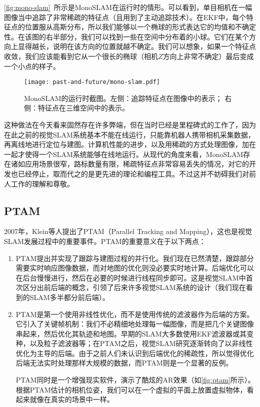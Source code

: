 \autoref{fig:mono-slam}~所示是MonoSLAM在运行时的情形。可以看到，单目相机在一幅图像当中追踪了非常稀疏的特征点（且用到了主动追踪技术）。在EKF中，每个特征点的位置服从高斯分布，所以我们能够以一个椭球的形式表达它的均值和不确定性。在该图的右半部分，我们可以找到一些在空间中分布着的小球。它们在某个方向上显得越长，说明在该方向的位置就越不确定。我们可以想象，如果一个特征点收敛，我们应该能看到它从一个很长的椭球（相机$Z$方向上非常不确定）最后变成一个小点的样子。

\begin{figure}[!htp]
	\centering
	\texttt{[image: past-and-future/mono-slam.pdf]}
	\caption{MonoSLAM的运行时截图。左侧：追踪特征点在图像中的表示； 右侧：特征点在三维空间中的表示。}
	\label{fig:mono-slam}
\end{figure}

这种做法在今天看来固然存在许多弊端，但在当时已经是里程碑式的工作了，因为在此之前的视觉SLAM系统基本不能在线运行，只能靠机器人携带相机采集数据，再离线地进行定位与建图。计算机性能的进步，以及用稀疏的方式处理图像，加在一起才使得一个SLAM系统能够在线地运行。从现代的角度来看，MonoSLAM存在诸如应用场景很窄，路标数量有限，稀疏特征点非常容易丢失的情况，对它的开发也已经停止，取而代之的是更先进的理论和编程工具。不过这并不妨碍我们对前人工作的理解和尊敬。

\subsection{PTAM}

2007年，Klein等人提出了PTAM（Parallel Tracking and Mapping）\textsuperscript{\cite{Klein2007}}，这也是视觉SLAM发展过程中的重要事件。PTAM的重要意义在于以下两点：
\clearpage
\begin{enumerate}
	\item PTAM提出并实现了跟踪与建图过程的并行化。我们现在已然清楚，跟踪部分需要实时响应图像数据，而对地图的优化则没必要实时地计算。后端优化可以在后台慢慢进行，然后在必要的时候进行线程同步即可。这是视觉SLAM中首次区分出前后端的概念，引领了后来许多视觉SLAM系统的设计（我们现在看到的SLAM多半都分前后端）。
	\item PTAM是第一个使用非线性优化，而不是使用传统的滤波器作为后端的方案。它引入了关键帧机制：我们不必精细地处理每一幅图像，而是把几个关键图像串起来，然后优化其轨迹和地图。早期的SLAM大多数使用EKF滤波器或其变种，以及粒子滤波器等；在PTAM之后，视觉SLAM研究逐渐转向了以非线性优化为主导的后端。由于之前人们未认识到后端优化的稀疏性，所以觉得优化后端无法实时处理那样大规模的数据，而PTAM则是一个显著的反例。

	\hspace{2em}PTAM同时是一个增强现实软件，演示了酷炫的AR效果（如\autoref{fig:ptam}所示）。根据PTAM估计的相机位姿，我们可以在一个虚拟的平面上放置虚拟物体，看起来就像在真实的场景中一样。
\end{enumerate}

